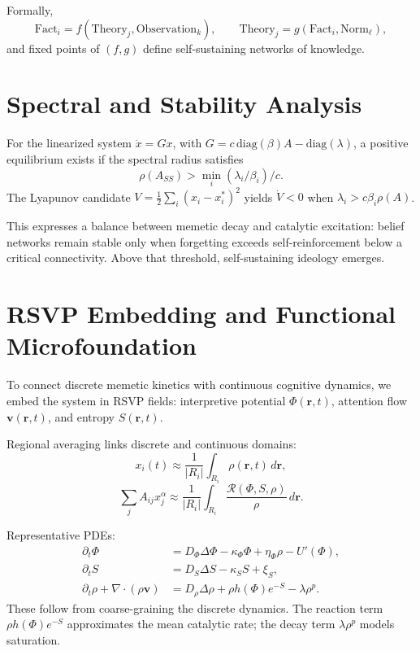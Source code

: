 \documentclass[11pt,a4paper]{article}
\newenvironment{narrative}{\begin{itshape}}{\end{itshape}}
\begin{document}
Formally,  
\[
\mathrm{Fact}_i = f(\mathrm{Theory}_j,\mathrm{Observation}_k),\qquad
\mathrm{Theory}_j = g(\mathrm{Fact}_i,\mathrm{Norm}_\ell),
\]
and fixed points of \((f,g)\) define self-sustaining networks of knowledge.

\section{Spectral and Stability Analysis}
For the linearized system \(\dot{x}=Gx\), with \(G = c\,\mathrm{diag}(\beta)A - \mathrm{diag}(\lambda)\), a positive equilibrium exists if the spectral radius satisfies
\[
\rho(A_{SS}) > \min_i (\lambda_i / \beta_i)/c.
\]
The Lyapunov candidate \(V = \frac{1}{2}\sum_i(x_i-x_i^*)^2\) yields \(\dot{V}<0\) when \(\lambda_i > c\beta_i \rho(A)\).  

\begin{narrative}
This expresses a balance between memetic decay and catalytic excitation: belief networks remain stable only when forgetting exceeds self-reinforcement below a critical connectivity. Above that threshold, self-sustaining ideology emerges.
\end{narrative}

\section{RSVP Embedding and Functional Microfoundation}
\begin{narrative}
To connect discrete memetic kinetics with continuous cognitive dynamics, we embed the system in RSVP fields: interpretive potential \(\Phi(\mathbf r,t)\), attention flow \(\mathbf v(\mathbf r,t)\), and entropy \(S(\mathbf r,t)\).
\end{narrative}

Regional averaging links discrete and continuous domains:
\[
x_i(t) \approx \frac{1}{|R_i|}\!\int_{R_i}\!\rho(\mathbf r,t)\,d\mathbf r,
\]
\[
\sum_jA_{ij}x_j^\alpha \approx 
\frac{1}{|R_i|}\!\int_{R_i}\!\frac{\mathcal R(\Phi,S,\rho)}{\rho}\,d\mathbf r.
\]

Representative PDEs:
\begin{align*}
\partial_t \Phi &= D_\Phi \Delta \Phi - \kappa_\Phi \Phi + \eta_\Phi\rho - U'(\Phi),\\
\partial_t S &= D_S \Delta S - \kappa_S S + \xi_S,\\
\partial_t \rho + \nabla\!\cdot(\rho\mathbf v) &= D_\rho \Delta\rho + \rho h(\Phi)e^{-S} - \lambda\rho^p.
\end{align*}
These follow from coarse-graining the discrete dynamics. The reaction term \(\rho h(\Phi)e^{-S}\) approximates the mean catalytic rate; the decay term \(\lambda\rho^p\) models saturation.  
\end{document}
